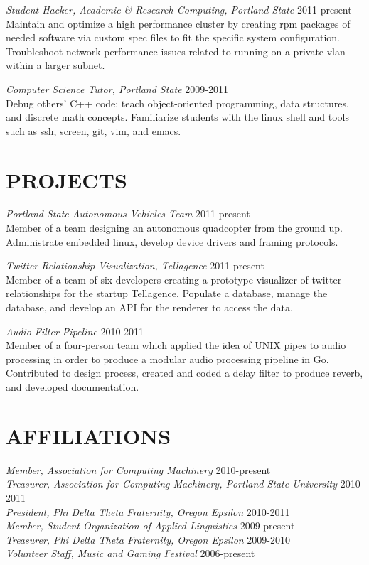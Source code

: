 \documentclass[overlapped]{res}
\begin{document}
\begin{resume}
{\sl Student Hacker, Academic \& Research Computing, Portland State} \hfill 2011-present\\
Maintain and optimize a high performance cluster by creating rpm packages of needed software via custom spec files to fit the specific system configuration. Troubleshoot network performance issues related to running on a private vlan within a larger subnet.

{\sl Computer Science Tutor, Portland State} \hfill 2009-2011\\
Debug others' C++ code; teach object-oriented programming, data structures, and discrete math concepts. Familiarize students with the linux shell and tools such as ssh, screen, git, vim, and emacs.

\section{PROJECTS} 
\vspace{7pt} 

{\sl Portland State Autonomous Vehicles Team} \hfill 2011-present\\
Member of a team designing an autonomous quadcopter from the ground up. Administrate embedded linux, develop device drivers and framing protocols.

{\sl Twitter Relationship Visualization, Tellagence} \hfill 2011-present\\
Member of a team of six developers creating a prototype visualizer of twitter relationships for the startup Tellagence. Populate a database, manage the database, and develop an API for the renderer to access the data.

{\sl Audio Filter Pipeline} \hfill 2010-2011\\
Member of a four-person team which applied the idea of UNIX pipes to audio processing in order to produce a modular audio processing pipeline in Go. Contributed to design process, created and coded a delay filter to produce reverb, and developed documentation.

\section{AFFILIATIONS}
\vspace{7pt} 

{\sl Member, Association for Computing Machinery} \hfill 2010-present\\
{\sl Treasurer, Association for Computing Machinery, Portland State University} \hfill 2010-2011\\
{\sl President, Phi Delta Theta Fraternity, Oregon Epsilon} \hfill 2010-2011\\
{\sl Member, Student Organization of Applied Linguistics} \hfill 2009-present\\
{\sl Treasurer, Phi Delta Theta Fraternity, Oregon Epsilon} \hfill 2009-2010\\
{\sl Volunteer Staff, Music and Gaming Festival} \hfill 2006-present


\end{resume}
\end{document}
